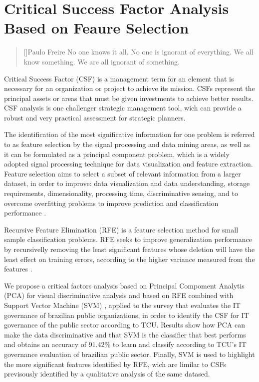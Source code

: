 \chapter{Critical Success Factor Analysis Based on Feaure Selection}
\label{ch:2_csf_fs}

\begin{quotation}[]{Paulo Freire}
No one knows it all. No one is ignorant of everything. We all know something. We are all ignorant of something.
\end{quotation}

Critical Success Factor (CSF) is a management term for an element that is necessary for an organization or project to achieve its mission. CSFs represent the principal assets or areas that must be given investments to achieve better results. CSF analysis is one challenger strategic management tool, wich can provide a robust and very practical assessment for strategic planners.

The identification of the most significative information for one problem is referred to as feature selection by the signal processing and data mining areas, as well as it can be formulated as a principal component problem, which is a widely adopted signal processing technique for data visualization and feature extraction. Feature selection aims to select a subset of relevant information from a larger dataset, in order to improve: data visualization and data understanding, storage requirements, dimensionality, processing time, discriminative sensing, and to overcome overfitting problems to improve prediction and classification performance \cite{chandrashekar2014survey}.

Recursive Feature Elimination (RFE) is a feature selection method for small sample classification problems. RFE seeks to improve generalization performance by recursivelly removing the least significant features whose deletion will have the least effect on training errors, according to the higher variance measured from the features \cite{chen2007enhanced}.

We propose a critical factors analysis based on Principal Compoment Analytis (PCA) for visual discriminative analysis and based on RFE combined with Support Vector Machine (SVM) \cite{hearst1998support}, applied to the survey that evaluates the IT governance of brazilian public organizations, in order to identify the CSF for IT governance of the public sector according to TCU. Results show how PCA can make the data discriminative and that SVM is the classifier that best performs and obtains an accuracy of 91.42\% to learn and classify according to TCU's IT governance evaluation of brazilian public sector. Finally, SVM is used to highlight the more significant features identified by RFE, wich are limilar to CSFs previsously identified by a qualitative analysis of the same datased.

